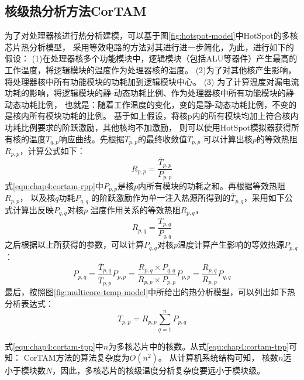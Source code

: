 \subsection{核级热分析方法CorTAM}
为了对处理器核进行热分析建模，可以基于图\ref{fig:hotspot-model}中HotSpot的多核芯片热分析模型， 采用等效电路的方法对其进行进一步简化，为此，进行如下的假设：
(1)在处理器核多个功能模块中，逻辑模块（包括ALU等器件）产生最高的工作温度，将逻辑模块的温度作为处理器核的温度。
(2)为了对其他核产生影响，将处理器核中所有功能模块的功耗加到逻辑模块中心。
(3) 为了计算温度对漏电流功耗的影响，将逻辑模块的静-动态功耗比例、作为处理器核中所有功能模块的静-动态功耗比例， 也就是：随着工作温度的变化，变的是静-动态功耗比例，不变的是核内所有模块功耗的比例。
基于如上假设，将核p内的所有模块均加上符合核内功耗比例要求的阶跃激励，其他核均不加激励， 则可以使用HotSpot模拟器获得所有核的温度$T_{q,p}$响应曲线。先根据$T_{p,p}$的最终收敛值$\overline{T}_{p,p}$ 可以计算出核$p$的等效热阻$R_{p,p}$，计算公式如下：
\begin{equation}
\label{equ:chap4:cortam-rpp}
R_{p,p} = \frac{\overline{T}_{p,p}}{P_{p,p}}
\end{equation}
式\ref{equ:chap4:cortam-rpp}中$P_{p,p}$是核$p$内所有模块的功耗之和。再根据等效热阻$R_{p,p}$， 以及核$q$功耗$P_{q,q}$ 的阶跃激励作为单一注入热源所得到的$\overline{T}_{p,q}$，采用如下公式计算出反映$P_{q,q}$对核$p$ 温度作用关系的等效热阻$R_{p,q}$，
\begin{equation}
\label{equ:chap4:cortam-rpq}
R_{p,q} = \frac{\overline{T}_{p,q}}{P_{q,q}}
\end{equation}
之后根据以上所获得的参数，可以计算$P_{q,q}$对核$p$温度计算产生影响的等效热源$P_{p,q}$：
\begin{equation}
\label{equ:chap4:cortam-ppq}
P_{p,q} = \frac{\overline{T}_{p,q}}{\overline{T}_{p,p}}P_{p,p} = \frac{R_{p,q}\times P_{q,q}}{R_{p,p}\times P_{p,p}}P_{p,p} = \frac{R_{p,q}}{R_{p,p}}P_{q,q}
\end{equation}
最后，按照图\ref{fig:multicore-temp-model}中所给出的热分析模型，可以列出如下热分析表达式：
\begin{equation}
\label{equ:chap4:cortam-tpp}
T_{p,p} = R_{p,p}\sum\limits_{q=1}^n P_{p,q}
\end{equation}

式\ref{equ:chap4:cortam-tpp}中$n$为多核芯片中的核数。从式\ref{equ:chap4:cortam-tpp}可知： CorTAM方法的算法复杂度为$O(n^2)$。 从计算机系统结构可知， 核数$n$远小于模块数$N$，因此，多核芯片的核级温度分析复杂度要远小于模块级。

